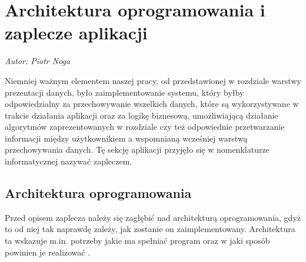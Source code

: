\chapter{Architektura oprogramowania i zaplecze aplikacji}
\label{chap:ZapleczeAplikacji}
\textit{Autor: Piotr Noga}
\par Niemniej ważnym elementem naszej pracy, od przedstawionej w rozdziale  warstwy prezentacji danych, było zaimplementowanie systemu, który byłby odpowiedzialny za przechowywanie wszelkich danych, które są wykorzystywane w trakcie działania aplikacji oraz za logikę biznesową, umożliwiającą działanie algorytmów zaprezentowanych w rozdziale  czy też odpowiednie przetwarzanie informacji między użytkownikiem a wspomnianą wcześniej warstwą przechowywania danych.
Tę sekcję aplikacji przyjęło się w nomenklaturze informatycznej nazywać zapleczem.

\section{Architektura oprogramowania}
\label{sec:ArchitekturaOprogramowania}
Przed opisem zaplecza należy się zagłębić nad architekturą oprogramowania, gdyż to od niej tak naprawdę zależy, jak zostanie on zaimplementowany. Architektura ta wskazuje m.in. potrzeby jakie ma spełniać program oraz w jaki sposób powinien je realizować \cite{AO}.

